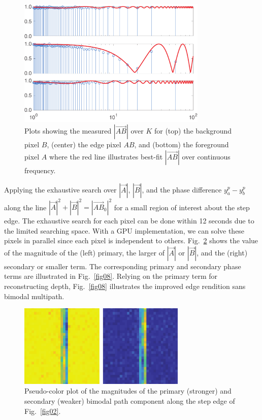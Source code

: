 \documentclass[10pt]{article}
\begin{document}
\begin{figure}[!t]
\centering\includegraphics[width=3.55in]{Figures/figure06}
\caption{Plots showing the measured $|\vec{AB}|$ over $K$ for (top) the background pixel $B$, (center) the edge pixel $AB$, and (bottom) the foreground pixel $A$ where the red line illustrates best-fit $|\vec{AB}|$ over continuous frequency. }
\label{fig06}
\end{figure}

Applying the exhaustive search over $|\vec{A}|$, $|\vec{B}|$, and the phase difference $y^p_a - y^p_b$ along the line $|\vec{A}|^2 + |\vec{B}|^2 = |\vec{AB}_{0}|^2$ for a small region of interest about the step edge. The exhaustive search for each pixel can be done within 12 seconds due to the limited searching space. With a GPU implementation, we can solve these pixels in parallel since each pixel is independent to others. Fig.~\ref{fig07} shows the value of the magnitude of the (left) primary, the larger of $|\vec{A}|$ or $|\vec{B}|$, and the (right) secondary or smaller term.  The corresponding primary and secondary phase terms are illustrated in Fig.~\ref{fig08}. Relying on the primary term for reconstructing depth, Fig.~\ref{fig08} illustrates the improved edge rendition sans bimodal multipath.

\begin{figure}[!t]
\centering\includegraphics[width=3.15in]{Figures/figure07}
\caption{Pseudo-color plot of the magnitudes of the primary (stronger) and secondary (weaker) bimodal path component along the step edge of Fig.~\ref{fig02}.}
\label{fig07}
\end{figure}
\end{document}
